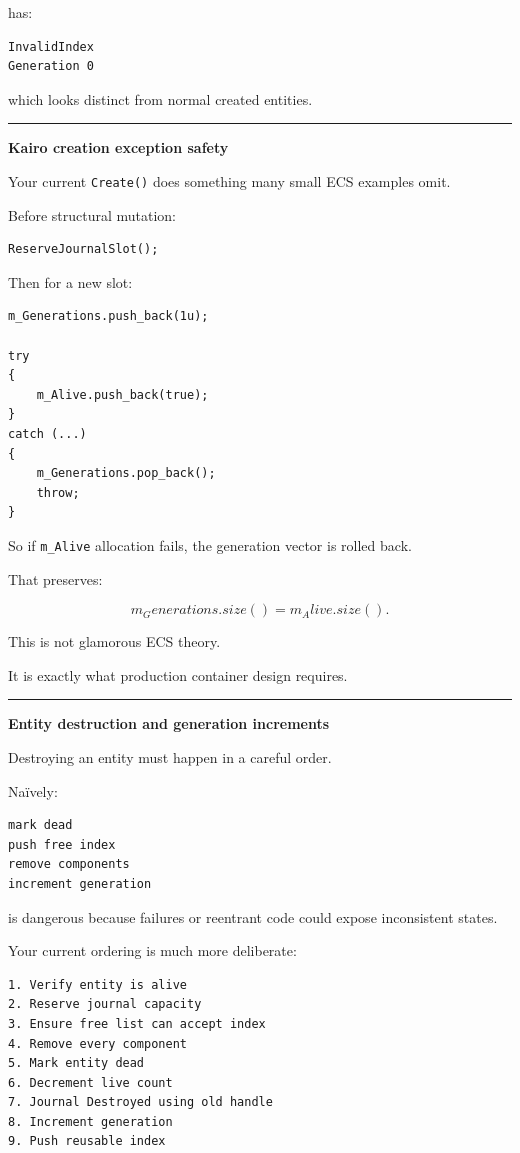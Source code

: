 has:

\begin{verbatim}
InvalidIndex
Generation 0
\end{verbatim}

which looks distinct from normal created entities.

\begin{center}\rule{0.5\linewidth}{0.5pt}\end{center}

\textbf{Kairo creation exception safety}

Your current \texttt{Create()} does something many small ECS examples omit.

Before structural mutation:

\begin{verbatim}
ReserveJournalSlot();
\end{verbatim}

Then for a new slot:

\begin{verbatim}
m_Generations.push_back(1u);

try
{
    m_Alive.push_back(true);
}
catch (...)
{
    m_Generations.pop_back();
    throw;
}
\end{verbatim}

So if \texttt{m\_Alive} allocation fails, the generation vector is rolled back.

That preserves:

\[
m_Generations.size()
=
m_Alive.size().
\]

This is not glamorous ECS theory.

It is exactly what production container design requires.

\begin{center}\rule{0.5\linewidth}{0.5pt}\end{center}

\textbf{Entity destruction and generation increments}

Destroying an entity must happen in a careful order.

Naïvely:

\begin{verbatim}
mark dead
push free index
remove components
increment generation
\end{verbatim}

is dangerous because failures or reentrant code could expose inconsistent states.

Your current ordering is much more deliberate:

\begin{verbatim}
1. Verify entity is alive
2. Reserve journal capacity
3. Ensure free list can accept index
4. Remove every component
5. Mark entity dead
6. Decrement live count
7. Journal Destroyed using old handle
8. Increment generation
9. Push reusable index
\end{verbatim}


